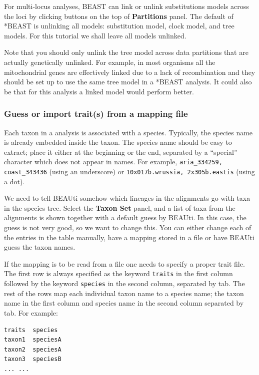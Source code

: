 \documentclass{article}
\begin{document}
For multi-locus analyses, BEAST can link or unlink substitutions models across the loci by clicking buttons on the top of {\bf Partitions} panel. The default of *BEAST is unlinking all models: substitution model, clock model, and tree models. For this tutorial we shall leave all models unlinked.

Note that you should only unlink the tree model across data partitions that are actually genetically unlinked. For example, in most organisms all the mitochondrial genes are effectively linked due to a lack of recombination and they should be set up to use the same tree model in a *BEAST analysis. It could also be that for this analysis a linked model would perform better.

\subsubsection{Guess or import trait(s) from a mapping file}

Each taxon in a \mlstname{} analysis is associated with a species. Typically, the
species name is already embedded inside the taxon. The species name should be
easy to extract; place it either at the beginning or the end, separated by a
``special'' character which does not appear in names. For example,
\texttt{aria\_334259, coast\_343436} (using an underscore) or
\texttt{10x017b.wrussia, 2x305b.eastis} (using a dot).

We need to tell BEAUti somehow which lineages in the alignments go with taxa in the species tree. Select the {\bf Taxon Set} panel, and a list of taxa from the alignments is shown together with a default guess by BEAUti. In this case, the guess is not very good, so we want to change this. You can either change each of the entries in the table manually, have a mapping stored in a file or have BEAUti guess the taxon names. 

If the mapping is to be read from a file one needs to specify a proper trait file. The first row is always specified as the keyword \texttt{traits} in the first column followed by the keyword \texttt{species} in the second column, separated by tab. The rest of the rows map each individual taxon name to a species name; the taxon name in the first column and species name in the second column separated by tab. For example:

\begin{verbatim}
traits	species
taxon1	speciesA
taxon2	speciesA
taxon3	speciesB
... ...
\end{verbatim}
\end{document}

